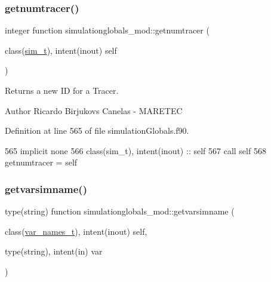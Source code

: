 \subsubsection{\texorpdfstring{getnumtracer()}{getnumtracer()}}
{\footnotesize\ttfamily integer function simulationglobals\+\_\+mod\+::getnumtracer (\begin{DoxyParamCaption}\item[{class(\mbox{\hyperlink{structsimulationglobals__mod_1_1sim__t}{sim\+\_\+t}}), intent(inout)}]{self }\end{DoxyParamCaption})\hspace{0.3cm}{\ttfamily [private]}}



Returns a new ID for a Tracer. 

\begin{DoxyAuthor}{Author}
Ricardo Birjukovs Canelas -\/ M\+A\+R\+E\+T\+EC 
\end{DoxyAuthor}


Definition at line 565 of file simulation\+Globals.\+f90.


\begin{DoxyCode}
565     \textcolor{keywordtype}{implicit none}
566     \textcolor{keywordtype}{class}(sim\_t), \textcolor{keywordtype}{intent(inout)} :: self
567     \textcolor{keyword}{call }self%
568     getnumtracer = self%
\end{DoxyCode}
\mbox{\label{namespacesimulationglobals__mod_ac83c53dd4e998e653981c7b1fa5dacbd}} 
\subsubsection{\texorpdfstring{getvarsimname()}{getvarsimname()}}
{\footnotesize\ttfamily type(string) function simulationglobals\+\_\+mod\+::getvarsimname (\begin{DoxyParamCaption}\item[{class(\mbox{\hyperlink{structsimulationglobals__mod_1_1var__names__t}{var\+\_\+names\+\_\+t}}), intent(inout)}]{self,  }\item[{type(string), intent(in)}]{var }\end{DoxyParamCaption})\hspace{0.3cm}{\ttfamily [private]}}



